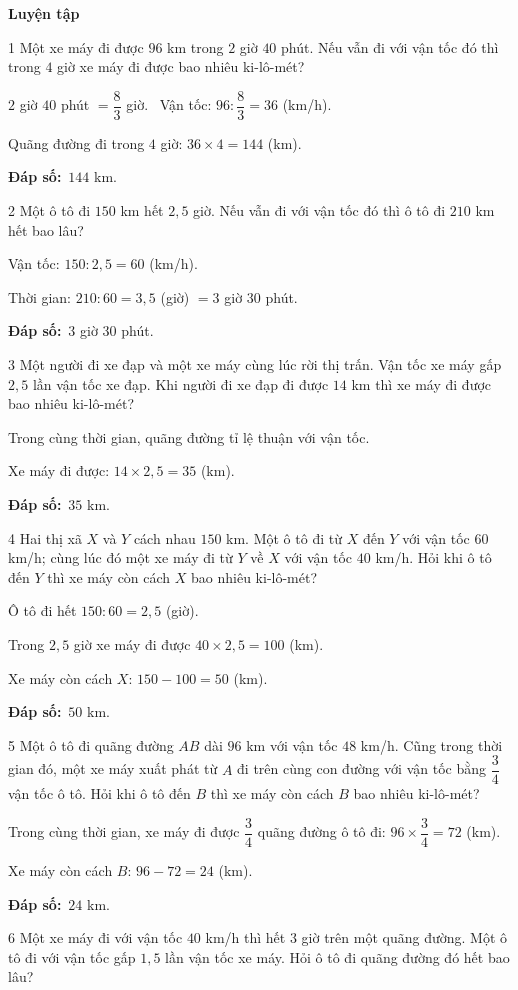 \documentclass[11pt]{article}
\newif\ifsol \solfalse
\providecommand{\AnsWord}{Đáp số}
\newcommand{\dapso}[1]{\par\textbf{\AnsWord:}\ #1}
\newcommand{\probsol}[1]{%
  \begin{lrbox}{\solmeasure}\begin{minipage}{\dimexpr\linewidth-24pt\relax}#1\end{minipage}\end{lrbox}%
  \ifsol
    \begin{solbox}#1\end{solbox}%
  \else
    \setlength{\solht}{\dimexpr\ht\solmeasure+\dp\solmeasure+0.85cm\relax}%
    \ifdim\solht<1.35cm\setlength{\solht}{1.35cm}\fi
    \begin{tcolorbox}[colback=white,colframe=Line,boxrule=0.8pt,arc=5pt,
      left=8pt,right=8pt,top=4pt,bottom=4pt,height=\solht]{\footnotesize\color{Slate}\itshape\WorkWord}\end{tcolorbox}%
  \fi}
\newcommand{\dividerbar}[1]{\par\vspace{0.6em}\noindent
  \begin{tcolorbox}[enhanced,frame hidden,interior hidden,borderline west={5pt}{0pt}{ProbBlue},
    colback=white,left=12pt,right=12pt,top=5pt,bottom=5pt,arc=4pt]
  {\large\bfseries\color{ProbBlue} #1}\end{tcolorbox}\vspace{0.4em}}
\newcommand{\gap}{\vspace{0.3cm}}
\def\WorkWord{Bài làm:}
\def\AnsWord{Đáp số}
\begin{document}
\dividerbar{Luyện tập}
\begin{probbox}{1}{\relax}
Một xe máy đi được $96$ km trong $2$ giờ $40$ phút. Nếu vẫn đi với vận tốc đó thì trong $4$ giờ xe máy đi được bao nhiêu ki-lô-mét?
\end{probbox}
\probsol{
$2$ giờ $40$ phút $=\dfrac83$ giờ. \ Vận tốc: $96:\dfrac83=36$ (km/h).\par Quãng đường đi trong $4$ giờ: $36\times4=144$ (km).
\dapso{$144$ km.}}
\gap
\begin{probbox}{2}{\relax}
Một ô tô đi $150$ km hết $2{,}5$ giờ. Nếu vẫn đi với vận tốc đó thì ô tô đi $210$ km hết bao lâu?
\end{probbox}
\probsol{
Vận tốc: $150:2{,}5=60$ (km/h).\par Thời gian: $210:60=3{,}5$ (giờ) $=3$ giờ $30$ phút.
\dapso{$3$ giờ $30$ phút.}}
\gap
\begin{probbox}{3}{\relax}
Một người đi xe đạp và một xe máy cùng lúc rời thị trấn. Vận tốc xe máy gấp $2{,}5$ lần vận tốc xe đạp. Khi người đi xe đạp đi được $14$ km thì xe máy đi được bao nhiêu ki-lô-mét?
\end{probbox}
\probsol{
Trong cùng thời gian, quãng đường tỉ lệ thuận với vận tốc.\par Xe máy đi được: $14\times2{,}5=35$ (km).
\dapso{$35$ km.}}
\gap
\begin{probbox}{4}{\relax}
Hai thị xã $X$ và $Y$ cách nhau $150$ km. Một ô tô đi từ $X$ đến $Y$ với vận tốc $60$ km/h; cùng lúc đó một xe máy đi từ $Y$ về $X$ với vận tốc $40$ km/h. Hỏi khi ô tô đến $Y$ thì xe máy còn cách $X$ bao nhiêu ki-lô-mét?
\end{probbox}
\probsol{
Ô tô đi hết $150:60=2{,}5$ (giờ).\par Trong $2{,}5$ giờ xe máy đi được $40\times2{,}5=100$ (km).\par Xe máy còn cách $X$: $150-100=50$ (km).
\dapso{$50$ km.}}
\gap
\begin{probbox}{5}{\relax}
Một ô tô đi quãng đường $AB$ dài $96$ km với vận tốc $48$ km/h. Cũng trong thời gian đó, một xe máy xuất phát từ $A$ đi trên cùng con đường với vận tốc bằng $\dfrac34$ vận tốc ô tô. Hỏi khi ô tô đến $B$ thì xe máy còn cách $B$ bao nhiêu ki-lô-mét?
\end{probbox}
\probsol{
Trong cùng thời gian, xe máy đi được $\dfrac34$ quãng đường ô tô đi: $96\times\dfrac34=72$ (km).\par Xe máy còn cách $B$: $96-72=24$ (km).
\dapso{$24$ km.}}
\gap
\begin{probbox}{6}{\relax}
Một xe máy đi với vận tốc $40$ km/h thì hết $3$ giờ trên một quãng đường. Một ô tô đi với vận tốc gấp $1{,}5$ lần vận tốc xe máy. Hỏi ô tô đi quãng đường đó hết bao lâu?
\end{probbox}
\end{document}
